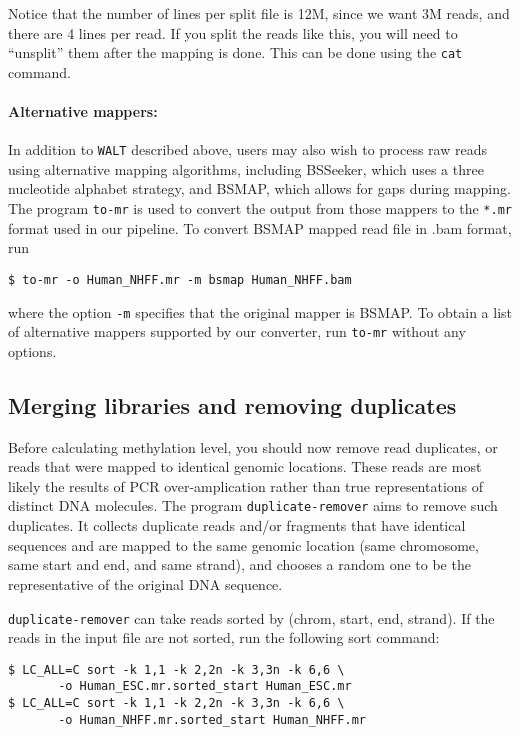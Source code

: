 \documentclass[10pt]{article}
\newcommand{\prog}[1]{\texttt{#1}}
\newcommand{\fn}[1]{\texttt{#1}}
\newcommand{\op}[1]{\texttt{#1}}
\begin{document}
Notice that the number of lines per split file is 12M, since we want
3M reads, and there are 4 lines per read. If you split the reads like
this, you will need to ``unsplit'' them after the mapping is done. This
can be done using the \prog{cat} command.

\paragraph{Alternative mappers:}
\label{sec:alternative-mappers}
In addition to \prog{WALT} described above, users may also wish
to process raw reads using alternative mapping algorithms, including
BSSeeker, which uses a three nucleotide alphabet strategy, and BSMAP,
which allows for gaps during mapping. The program \prog{to-mr} is used
to convert the output from those mappers to the \fn{*.mr} format used in
our pipeline. To convert BSMAP mapped read file in .bam format, run

\begin{verbatim}
$ to-mr -o Human_NHFF.mr -m bsmap Human_NHFF.bam
\end{verbatim}

where the option \op{-m} specifies that the original mapper is
BSMAP. To obtain a list of alternative mappers supported by our
converter, run \prog{to-mr} without any options. 

\subsection{Merging libraries and removing duplicates}

Before calculating methylation level, you should now remove read
duplicates, or reads that were mapped to identical genomic
locations. These reads are most likely the results of PCR
over-amplication rather than true representations of distinct DNA
molecules. The program \prog{duplicate-remover} aims to remove such
duplicates. It collects duplicate reads and/or fragments that have
identical sequences and are mapped to the same genomic location (same
chromosome, same start and end, and same strand), and chooses a random
one to be the representative of the original DNA sequence.

\prog{duplicate-remover} can take reads sorted by (chrom, start, end,
strand). If the reads in the input file are not sorted, run the
following sort command:

\begin{verbatim}
$ LC_ALL=C sort -k 1,1 -k 2,2n -k 3,3n -k 6,6 \
       -o Human_ESC.mr.sorted_start Human_ESC.mr
$ LC_ALL=C sort -k 1,1 -k 2,2n -k 3,3n -k 6,6 \
       -o Human_NHFF.mr.sorted_start Human_NHFF.mr
\end{verbatim}
\end{document}
